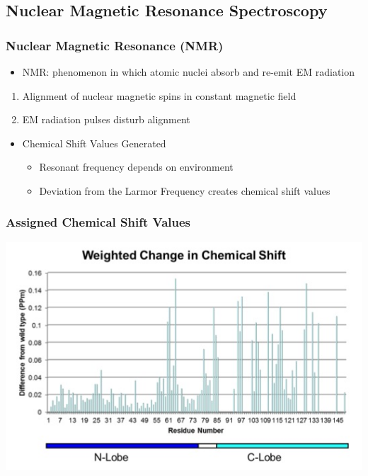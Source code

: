 \documentclass{beamer}
\begin{document}
\subsection{Nuclear Magnetic Resonance Spectroscopy} 
\begin{frame}
	\frametitle{Nuclear Magnetic Resonance (NMR)}
	\begin{itemize}
		\item NMR:  phenomenon in which atomic nuclei absorb and re-emit EM radiation
	\end{itemize}
	\begin{enumerate}
		\item Alignment of nuclear magnetic spins in constant magnetic field
		\item EM radiation pulses disturb alignment
	\end{enumerate}
	\begin{itemize}
		\item  Chemical Shift Values Generated
		\begin{itemize}
			\item Resonant frequency depends on environment
			\item Deviation from the Larmor Frequency creates chemical shift values
		\end{itemize}
	\end{itemize}
\end{frame}


\begin{frame}
	\frametitle{Assigned Chemical Shift Values}
    \vspace{-.5cm}
	\center
	\includegraphics[width=.9\textwidth]{ChemShiftChart}
\end{frame}
\end{document}
